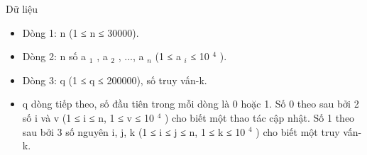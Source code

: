 Dữ liệu
\begin{itemize}
	\item     Dòng 1: n (1 ≤ n ≤ 30000).   
	\item     Dòng 2: n số a    $_     1    $    , a    $_     2    $    , ...,   a    $_     n    $    (1 ≤ a    $_     i    $    ≤   10    $^     4    $    ).   
	\item     Dòng 3: q (1 ≤ q ≤ 200000), số truy vấn-k.   
	\item     q dòng tiếp theo, số đầu tiên trong mỗi dòng là 0 hoặc 1. Số 0 theo sau bởi 2 số i và v (1 ≤ i ≤ n, 1 ≤ v ≤ 10    $^     4    $    ) cho biết một thao tác cập nhật. Số 1 theo sau bởi 3 số nguyên i, j, k (1 ≤ i ≤ j ≤ n, 1 ≤ k ≤ 10    $^     4    $    ) cho biết một truy vấn-k.   
\end{itemize}